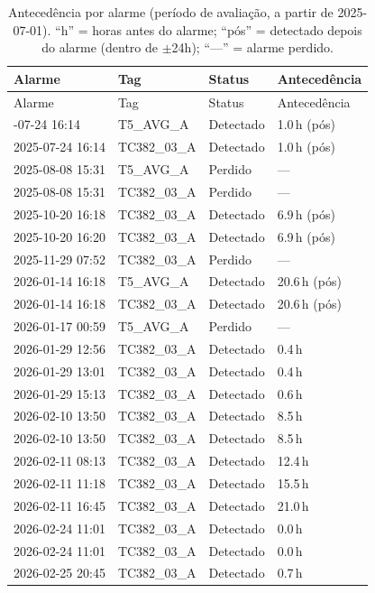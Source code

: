 \documentclass[11pt,a4paper]{article}
\begin{document}
\begin{longtable}{p{3.3cm}p{2.3cm}p{2.0cm}p{2.6cm}}
\caption{Antecedência por alarme (período de avaliação, a partir de
2025-07-01). ``h'' = horas antes do alarme; ``pós'' = detectado depois
do alarme (dentro de $\pm$24h); ``---'' = alarme perdido.}
\label{tab:antecedencia}\\
\toprule
Alarme & Tag & Status & Antecedência \\
\midrule
\endfirsthead
\toprule
Alarme & Tag & Status & Antecedência \\
\midrule
\endhead
\bottomrule
\endfoot
2025-07-24 16:14 & T5\_AVG\_A & Detectado & 1.0\,h (pós) \\
2025-07-24 16:14 & TC382\_03\_A & Detectado & 1.0\,h (pós) \\
2025-08-08 15:31 & T5\_AVG\_A & Perdido & --- \\
2025-08-08 15:31 & TC382\_03\_A & Perdido & --- \\
2025-10-20 16:18 & TC382\_03\_A & Detectado & 6.9\,h (pós) \\
2025-10-20 16:20 & TC382\_03\_A & Detectado & 6.9\,h (pós) \\
2025-11-29 07:52 & TC382\_03\_A & Perdido & --- \\
2026-01-14 16:18 & T5\_AVG\_A & Detectado & 20.6\,h (pós) \\
2026-01-14 16:18 & TC382\_03\_A & Detectado & 20.6\,h (pós) \\
2026-01-17 00:59 & T5\_AVG\_A & Perdido & --- \\
2026-01-29 12:56 & TC382\_03\_A & Detectado & 0.4\,h \\
2026-01-29 13:01 & TC382\_03\_A & Detectado & 0.4\,h \\
2026-01-29 15:13 & TC382\_03\_A & Detectado & 0.6\,h \\
2026-02-10 13:50 & TC382\_03\_A & Detectado & 8.5\,h \\
2026-02-10 13:50 & TC382\_03\_A & Detectado & 8.5\,h \\
2026-02-11 08:13 & TC382\_03\_A & Detectado & 12.4\,h \\
2026-02-11 11:18 & TC382\_03\_A & Detectado & 15.5\,h \\
2026-02-11 16:45 & TC382\_03\_A & Detectado & 21.0\,h \\
2026-02-24 11:01 & TC382\_03\_A & Detectado & 0.0\,h \\
2026-02-24 11:01 & TC382\_03\_A & Detectado & 0.0\,h \\
2026-02-25 20:45 & TC382\_03\_A & Detectado & 0.7\,h \\

\end{longtable}
\end{document}
